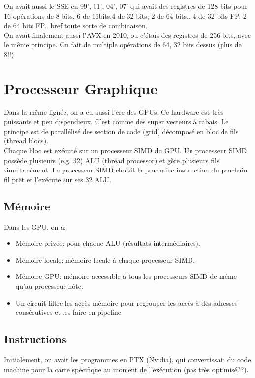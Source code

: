 \documentclass[oneside]{book}
\begin{document}
On avait aussi le SSE en 99', 01', 04', 07' qui avait des registres de 128 bits pour 16 opérations de 8 bits, 6 de 16bits,4 de 32 bits, 2 de 64 bits.. 4 de 32 bits FP, 2 de 64 bits FP.. bref toute sorte de combinaison.\\

On avait finalement aussi l'AVX en 2010, ou c'étais des registres de 256 bits, avec le même principe. On fait de multiple opérations de 64, 32 bits dessus (plus de 8!!).\\

\section{Processeur Graphique}
Dans la même lignée, on a eu aussi l'ère des GPUs. Ce hardware est très puissants et peu dispendieux. C'est comme des super vecteurs à rabais. Le principe est de parallélisé des section de code (grid) décomposé en bloc de fils (thread blocs).\\

Chaque bloc est exécuté sur un processeur SIMD du GPU. Un processeur SIMD possède plusieurs (e.g. 32) ALU (thread processor) et gère plusieurs fils simultanément. Le processeur SIMD choisit la prochaine instruction du
prochain fil prêt et l'exécute sur ses 32 ALU.


\subsection{Mémoire}

Dans les GPU, on a:
\begin{itemize}
\item Mémoire privée: pour chaque ALU (résultats
intermédiaires).
\item Mémoire locale: mémoire locale à chaque processeur
SIMD.
\item Mémoire GPU: mémoire accessible à tous les processeurs
SIMD de même qu'au processeur hôte.

\item Un circuit filtre les accès mémoire pour regrouper les
accès à des adresses consécutives et les faire en pipeline
\end{itemize}

\subsection{Instructions}
Initialement, on avait les programmes en PTX (Nvidia), qui convertissait du code machine pour la carte spécifique au moment de l'exécution (pas très optimisé??).\\
\end{document}
